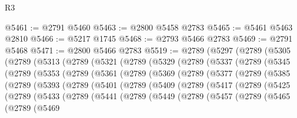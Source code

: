 \begin{lexlean}{R3}
\begin{coremodule}
@5461 := @2791 @5460
@5463 := @2800 @5458 @2783
@5465 := @5461 @5463 @2810
@5466 := @5217 @1745
@5468 := @2793 @5466 @2783
@5469 := @2791 @5468
@5471 := @2800 @5466 @2783
@5519 := @2789
    (@5297
      (@2789
        (@5305
          (@2789
            (@5313
              (@2789
                (@5321
                  (@2789
                    (@5329
                      (@2789
                        (@5337
                          (@2789
                            (@5345
                              (@2789
                                (@5353
                                  (@2789
                                    (@5361
                                      (@2789
                                        (@5369
                                          (@2789
                                            (@5377
                                              (@2789
                                                (@5385
                                                  (@2789
                                                    (@5393
                                                      (@2789
                                                        (@5401
                                                          (@2789
                                                            (@5409
                                                              (@2789
                                                                (@5417
                                                                  (@2789
                                                                    (@5425
                                                                      (@2789
                                                                        (@5433
                                                                          (@2789
                                                                            (@5441
                                                                              (@2789
                                                                                (@5449
                                                                                  (@2789
                                                                                    (@5457
                                                                                      (@2789
                                                                                        (@5465
                                                                                          (@2789
                                                                                            (@5469

\end{coremodule}
\end{lexlean}
